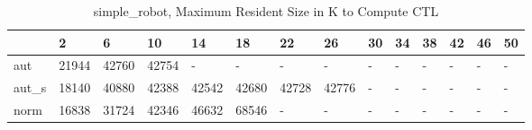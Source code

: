 \begin{table}
\caption{simple_robot, Maximum Resident Size in K to Compute CTL}
\label{simple_robot_CTL_size}
\begin{tabular}{llllllllllllll}
\toprule
 & 2 & 6 & 10 & 14 & 18 & 22 & 26 & 30 & 34 & 38 & 42 & 46 & 50 \\
\midrule
aut & 21944 & 42760 & 42754 & - & - & - & - & - & - & - & - & - & - \\
aut_s & 18140 & 40880 & 42388 & 42542 & 42680 & 42728 & 42776 & - & - & - & - & - & - \\
norm & 16838 & 31724 & 42346 & 46632 & 68546 & - & - & - & - & - & - & - & - \\
\bottomrule
\end{tabular}
\end{table}

